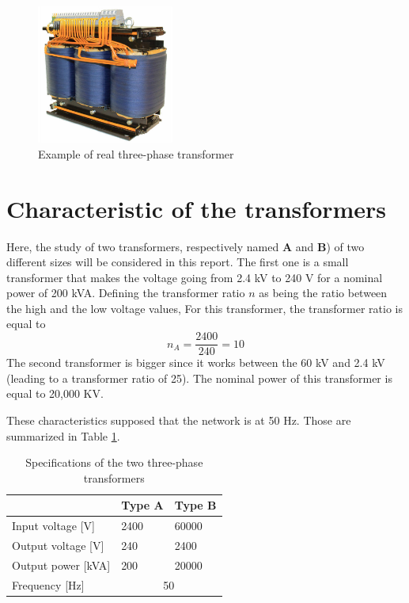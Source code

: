 \documentclass[12pt,a4paper]{report}
\begin{document}
\begin{figure}[h]
    \centering
    \includegraphics[width=0.4\textwidth]{real_transfo.jpg}
    \caption{Example of real three-phase transformer}
    \label{fig:real_transformer}
\end{figure}
\newpage
\section{Characteristic of the transformers}
Here, the study of two transformers, respectively named \textbf{A} and \textbf{B}) of two different sizes will be considered in this report. The first one is a small transformer that makes the voltage going from 2.4 kV to 240 V for a nominal power of 200 kVA. Defining the transformer ratio $n$ as being the ratio between the high and the low voltage values, For this transformer, the transformer ratio is equal to 
\begin{equation}
    n_A = \frac{2400}{240} = 10
\end{equation}
The second transformer is bigger since it works between the 60 kV and 2.4 kV (leading to a transformer ratio of 25). The nominal power of this transformer is equal to 20,000 KV.

These characteristics supposed that the network is at 50 Hz. Those are summarized in Table \ref{tab:caracteristics_transfo}.

\begin{table}[h]
    \centering
\begin{tabular}{|l|l|l|}
  \hline
   & \textbf{Type A} &\textbf{Type B}\\
  \hline
    Input voltage [V]& 2400 & 60000\\\hline
    Output voltage [V] & 240 & 2400\\\hline
    Output power [kVA] & 200 & 20000\\\hline
    Frequency [Hz] & \multicolumn{2}{c|}{50}\\
  \hline
\end{tabular}
    \caption{Specifications of the two three-phase transformers}
    \label{tab:caracteristics_transfo}
\end{table}
\end{document}
